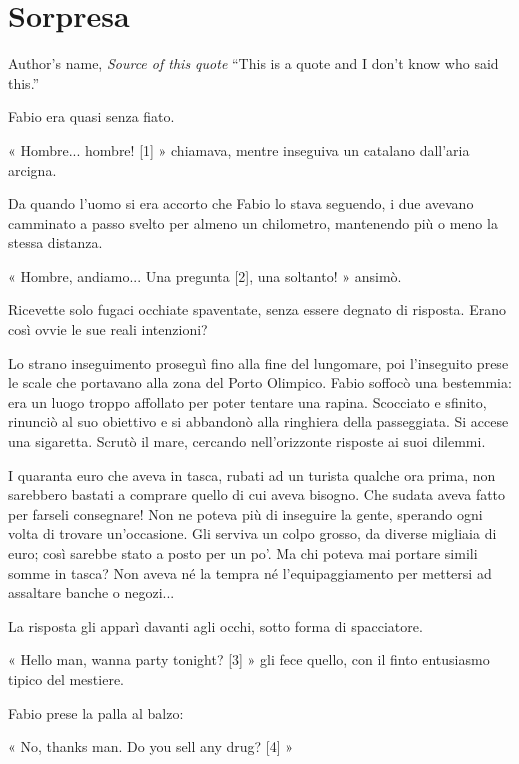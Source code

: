 \chapter{Sorpresa}

\begin{chapquote}{Author's name, \textit{Source of this quote}}
``This is a quote and I don't know who said this.''
\end{chapquote}



Fabio era quasi senza fiato.

« Hombre... hombre! [1] » chiamava, mentre inseguiva un catalano dall'aria arcigna. 

Da quando l'uomo si era accorto che Fabio lo stava seguendo, i due avevano camminato a passo svelto per almeno un chilometro, mantenendo più o meno la stessa distanza.

« Hombre, andiamo... Una pregunta [2], una soltanto! » ansimò. 

Ricevette solo fugaci occhiate spaventate, senza essere degnato di risposta. Erano così ovvie le sue reali intenzioni?

Lo strano inseguimento proseguì fino alla fine del lungomare, poi l'inseguito prese le scale che portavano alla zona del Porto Olimpico. Fabio soffocò una bestemmia: era un luogo troppo affollato per poter tentare una rapina. Scocciato e sfinito, rinunciò al suo obiettivo e si abbandonò alla ringhiera della passeggiata. Si accese una sigaretta. Scrutò il mare, cercando nell'orizzonte risposte ai suoi dilemmi.

I quaranta euro che aveva in tasca, rubati ad un turista qualche ora prima, non sarebbero bastati a comprare quello di cui aveva bisogno. Che sudata aveva fatto per farseli consegnare! Non ne poteva più di inseguire la gente, sperando ogni volta di trovare un'occasione. Gli serviva un colpo grosso, da diverse migliaia di euro; così sarebbe stato a posto per un po'. Ma chi poteva mai portare simili somme in tasca? Non aveva né la tempra né l'equipaggiamento per mettersi ad assaltare banche o negozi...

La risposta gli apparì davanti agli occhi, sotto forma di spacciatore.

« Hello man, wanna party tonight? [3] » gli fece quello, con il finto entusiasmo tipico del mestiere.

Fabio prese la palla al balzo:

« No, thanks man. Do you sell any drug? [4] »

